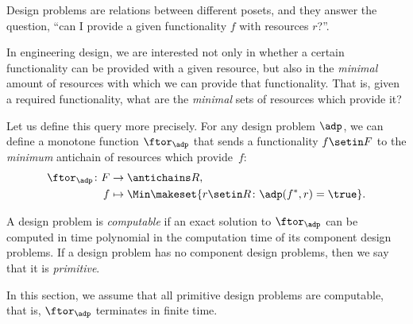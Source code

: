 
\label{sec:computation}

Design problems are relations between different posets, and they answer the question, ``can I provide a given functionality $f$ with resources $r$?''.

In engineering design, we are interested not only in whether a certain functionality can be provided with a given resource, but also in the \emph{minimal} amount of resources with which we can provide that functionality.
That is, given a required functionality, what are the \emph{minimal} sets of resources which provide it?

Let us define this query more precisely.
For any design problem $\adp$, we can define a monotone function $\ftor_\adp$ that sends a functionality $f \setin F$ to the \emph{minimum} antichain of resources which provide~$f$:
\begin{equation}
    \begin{aligned}
        \ftor_\adp \colon F & \to \antichains R, \\
        f                   & \mapsto \Min \makeset{ r \setin R \colon \adp(f^*, r) = \true }.
    \end{aligned}
\end{equation}

\begin{definition}
    A design problem is \emph{computable} if an exact solution to $\ftor_\adp$ can be computed in time polynomial in the computation time of its component design problems.
    If a design problem has no component design problems, then we say that it is \emph{primitive}.
\end{definition}

In this section, we assume that all primitive design problems are computable, that is, $\ftor_\adp$ terminates in finite time.


